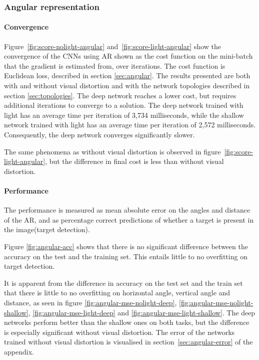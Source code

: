 

\subsubsection{Angular representation}
\paragraph{Convergence}
Figure~\ref{fig:score-nolight-angular} and~\ref{fig:score-light-angular} show the convergence of the CNNs using AR shown as the cost function on the mini-batch that the gradient is estimated from, over iterations. The cost function is Euclidean loss, described in section \ref{sec:angular}.
The results presented are both with and without visual distortion and with the network topologies described in section \ref{sec:topologies}. The deep network reaches a lower cost, but requires additional iterations to converge to a solution. The deep network trained with light has an average time per iteration of 3,734 milliseconds, while the shallow network trained with light has an average time per iteration of 2,572 milliseconds. Consequently, the deep network converges significantly slower.

The same phenomena as without visual distortion is observed in figure~\ref{fig:score-light-angular}, but the difference in final cost is less than without visual distortion.





\paragraph{Performance}
\label{sec:results-angular-representation}
The performance is measured as mean absolute error on the angles and distance of the AR, and as percentage correct predictions of whether a target is present in the image(target detection).

Figure \ref{fig:angular-acc} shows that there is no significant difference between the accuracy on the test and the training set. This entails little to no overfitting on target detection.

It is apparent from the difference in accuracy on the test set and the train set that there is little to no overfitting on horizontal angle, vertical angle and distance, as seen in figure \ref{fig:angular-mse-nolight-deep}, \ref{fig:angular-mse-nolight-shallow}, \ref{fig:angular-mse-light-deep} and \ref{fig:angular-mse-light-shallow}. The deep networks perform better than the shallow ones on both tasks, but the difference is especially significant without visual distortion. The error of the networks trained without visual distortion is visualised in section~\ref{sec:angular-error} of the appendix.


